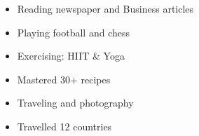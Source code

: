 %
%
%

\twocolumnsection
{
\begin{skills}
\end{skills}}
{
\vspace{1em}
\begin{itemize}
	\item Reading newspaper and Business articles
	\item Playing football and chess               \item  Exercising: HIIT \& Yoga
    \item  Mastered 30+ recipes
    \item  Traveling and photography
    \item  Travelled 12 countries
\end{itemize}
}